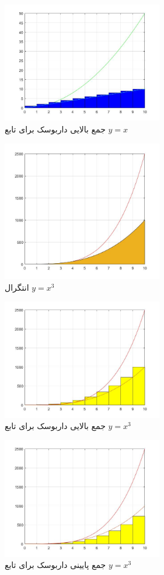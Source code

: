 \documentclass{article}
\begin{document}
\begin{figure}[!h]
    \centering
\includegraphics[width=7cm]{pic7integral.jpg}
    \caption{
    جمع بالایی داربوسک برای تابع 
    $y=x$
    }
    \label{fig:انتگرال خط}
\end{figure}

\begin{figure}[!h]
    \centering
\includegraphics[width=7cm]{x33.jpg}
    \caption{انتگرال $y=x^3$}
    \label{fig:انتگرال خط}
\end{figure}

\begin{figure}[!h]
    \centering
\includegraphics[width=7cm]{pic8integral.jpg}
    \caption{جمع بالایی داربوسک برای تابع $y=x^3$}
    \label{fig:انتگرال خط}
\end{figure}

\begin{figure}[!h]
    \centering
\includegraphics[width=7cm]{pic9code9Integal.jpg}
    \caption{جمع پایینی داربوسک برای تابع $y=x^3$}
    \label{fig:انتگرال خط}
\end{figure}
\newpage
\end{document}
